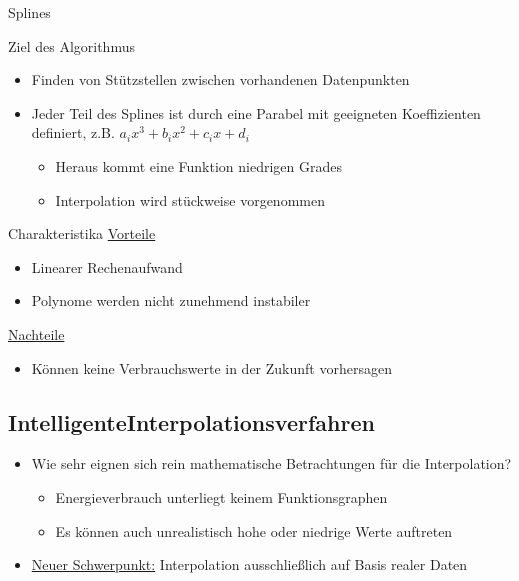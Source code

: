 \begin{frame}{Splines}
\begin{block}{Ziel des Algorithmus}
\begin{itemize}
\item Finden von Stützstellen zwischen vorhandenen Datenpunkten
\item Jeder Teil des Splines ist durch eine Parabel mit geeigneten Koeffizienten definiert, z.B. $a_{i}x^3 + b_{i}x^2 + c_{i}x + d_{i}$
\begin{itemize}
\item Heraus kommt eine Funktion niedrigen Grades
\item Interpolation wird stückweise vorgenommen
\end{itemize}
\end{itemize}
\end{block}
\begin{block} {Charakteristika}
\underline{Vorteile}
\begin{itemize}
\item Linearer Rechenaufwand
\item Polynome werden nicht zunehmend instabiler
\end{itemize}
\underline{Nachteile}
\begin{itemize}
\item Können keine Verbrauchswerte in der Zukunft vorhersagen
\end{itemize}
\end{block}
\end{frame}

\subsection{\grqq Intelligente\grqq Interpolationsverfahren}
\begin{frame}{\insertsubsectionhead}
\begin{itemize}
\item Wie sehr eignen sich rein mathematische Betrachtungen für die Interpolation?
\begin{itemize}
\item Energieverbrauch unterliegt keinem Funktionsgraphen
\item Es können auch unrealistisch hohe oder niedrige Werte auftreten
\end{itemize}
\item \underline{Neuer Schwerpunkt:} Interpolation ausschließlich auf Basis realer Daten
\end{itemize}
\end{frame}

